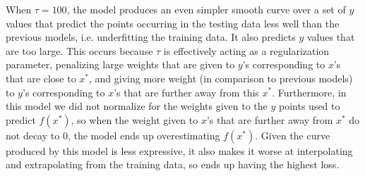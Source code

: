 \documentclass[submit]{harvardml}
\begin{document}
\noindent When $\tau = 100$, the model produces an even simpler smooth curve over a set of $y$ values that predict the points occurring in the testing data less well than the previous models, i.e. underfitting the training data. It also predicts $y$ values that are too large. This occurs because $\tau$ is effectively acting as a regularization parameter, penalizing large weights that are given to $y$'s corresponding to $x$'s that are close to $x^*$, and giving more weight (in comparison to previous models) to $y$'s corresponding to $x$'s that are further away from this $x^*$. Furthermore, in this model we did not normalize for the weights given to the $y$ points used to predict $f(x^*)$, so when the weight given to $x$'s that are further away from $x^*$ do not decay to $0$, the model ends up overestimating $f(x^*)$. Given the curve produced by this model is less expressive, it also makes it worse at interpolating and extrapolating from the training data, so ends up having the highest loss.\\

\newpage

\end{document}

